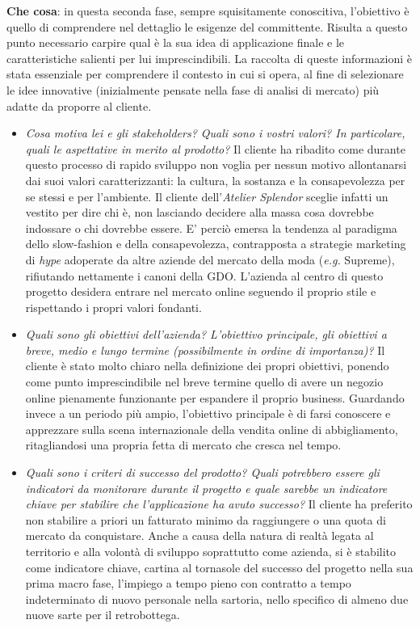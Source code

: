 \documentclass[12pt]{article}
\begin{document}
\textbf{Che cosa}: in questa seconda fase, sempre squisitamente conoscitiva, l'obiettivo è quello di comprendere nel dettaglio le esigenze del committente. Risulta a questo punto necessario carpire qual è la sua idea di applicazione finale e le caratteristiche salienti per lui imprescindibili. La raccolta di queste informazioni è stata essenziale per comprendere il contesto in cui si opera, al fine di selezionare le idee innovative (inizialmente pensate nella fase di analisi di mercato) più adatte da proporre al cliente.
\begin{itemize}
    \item {\em Cosa motiva lei e gli stakeholders? Quali sono i vostri valori? In particolare, quali le aspettative in merito al prodotto?} 
    Il cliente ha ribadito come durante questo processo di rapido sviluppo non voglia per nessun motivo allontanarsi dai suoi valori caratterizzanti: la cultura, la sostanza e la consapevolezza per se stessi e per l'ambiente. Il cliente dell'{\em Atelier Splendor} sceglie infatti un vestito per dire chi è, non lasciando decidere alla massa cosa dovrebbe indossare o chi dovrebbe essere. E' perciò emersa la tendenza al paradigma dello slow-fashion e della consapevolezza, contrapposta a strategie marketing di {\em hype} adoperate da altre aziende del mercato della moda ({\em e.g.} Supreme), rifiutando nettamente i canoni della GDO. L'azienda al centro di questo progetto desidera entrare nel mercato online seguendo il proprio stile e rispettando i propri valori fondanti.

    \item {\em Quali sono gli obiettivi dell’azienda? L’obiettivo principale, gli obiettivi a breve, medio e lungo termine (possibilmente in ordine di importanza)?} Il cliente è stato molto chiaro nella definizione dei propri obiettivi, ponendo come punto imprescindibile nel breve termine quello di avere un negozio online pienamente funzionante per espandere il proprio business. Guardando invece a un periodo più ampio, l'obiettivo principale è di farsi conoscere e apprezzare sulla scena internazionale della vendita online di abbigliamento, ritagliandosi una propria fetta di mercato che cresca nel tempo.

    \item {\em Quali sono i criteri di successo del prodotto? Quali potrebbero essere gli indicatori da monitorare durante il progetto e quale sarebbe un indicatore chiave per stabilire che l'applicazione ha avuto successo?}    
    Il cliente ha preferito non stabilire a priori un fatturato minimo da raggiungere o una quota di mercato da conquistare. Anche a causa della natura di realtà legata al territorio e alla volontà di sviluppo soprattutto come azienda, si è stabilito come indicatore chiave, cartina al tornasole del successo del progetto nella sua prima macro fase, l'impiego a tempo pieno con contratto a tempo indeterminato di nuovo personale nella sartoria, nello specifico di almeno due nuove sarte per il retrobottega.
\end{itemize}
\end{document}
